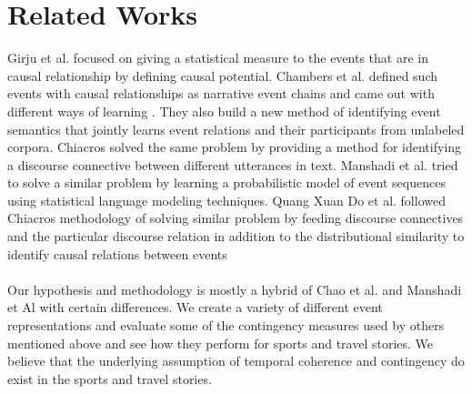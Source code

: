 \documentclass[12pt]{article}
\begin{document}
\section{Related Works}
Girju et al. focused on giving a statistical measure to the events that are in causal  relationship by defining causal potential\cite{cp}. Chambers et al. defined such events with causal relationships as narrative event chains and came out with different ways of learning \cite{nec}. They also build a new method of identifying event semantics that jointly learns event relations and their participants from unlabeled corpora\cite{cloze}. Chiacros solved the same problem by providing a method for identifying a discourse connective between different utterances in text\cite{chiacro}. Manshadi et al. tried to solve a similar problem by learning a probabilistic model of event sequences using statistical language modeling techniques\cite{manshadi}. Quang Xuan Do et al. followed Chiacros methodology of solving similar problem by feeding discourse connectives and the particular discourse relation in addition to the distributional similarity to identify causal relations between events\cite{do}\\
\smallskip \\
Our hypothesis and methodology is mostly a hybrid of Chao et al. and Manshadi et Al with certain differences. We create a variety of different event representations and evaluate some of the contingency measures used by others mentioned above and see how they perform for sports and travel stories. We believe that the underlying assumption of temporal coherence and contingency do exist in the sports and travel stories.  \\
\medskip \\
\end{document}
